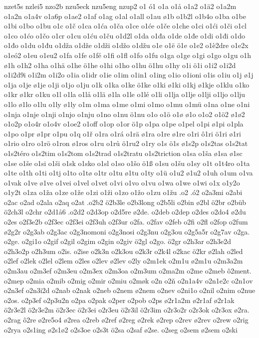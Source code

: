 {{nzet5s
nzlei5
nzo2b
nzu5eck
nzu5eng
nzup2
o1
ó1
o1a
o1å
o1a2
o1ä2
o1a2m
o1a2n
o1a4v
o1a6p
o1ae2
o1af
o1ag
o1al
o1all
o1au
ø1b
o1b2l
o1b4o
o1ba
o1be
o1bi
o1bo
o1bu
o1c
o1č
o1ca
o1ća
o1ča
o1ce
o1će
o1če
o1che
o1ci
o1ći
o1či
o1cl
o1co
o1ćo
o1čo
o1cr
o1cu
o1ću
o1ču
o1d2l
o1da
o1đa
o1de
o1đe
o1di
o1đi
o1do
o1đo
o1du
o1đu
o1dža
o1dže
o1dži
o1džo
o1džu
o1e
o1ë
ö1e
o1e2
o1è2dre
o1e2x
o1eó2
o1eu
o1eu2
o1fa
o1fe
o1fé
o1fi
o1fl
o1fo
o1fu
o1ga
o1ge
o1gi
o1go
o1gu
o1h
ø1h
o1h2
o1ha
o1hä
o1he
ö1he
o1hi
o1ho
o1hu
ö1hu
o1hy
o1i
ö1i
o1i2
o1i2d
o1i2d9i
o1i2m
o1i2o
o1ia
o1idr
o1ie
o1im
o1in1
o1ing
o1io
o1ioni
o1is
o1iu
o1j
ø1j
o1ja
o1je
ø1je
o1ji
o1jo
o1ju
o1k
o1ka
o1ke
ö1ke
o1ki
ø1ki
o1kj
ø1kje
o1klu
o1ko
o1kr
ø1kr
o1ku
o1l
o1la
o1lå
o1lä
ø1la
o1le
o1lé
o1li
o1lja
o1lje
o1lji
o1ljo
o1lju
o1lo
ø1lo
o1lu
o1ly
ø1ly
o1m
o1ma
o1me
o1mi
o1mo
o1mu
o1mü
o1na
o1ne
o1ni
o1nja
o1nje
o1nji
o1njo
o1nju
o1no
o1nu
ö1nu
o1o
o1ö
o1ø
ø1o
o1o2
o1ö2
ø1ø2
o1o2p
o1o4r
o1o4v
o1oe2
o1off
o1op
o1or
ö1p
o1pa
o1pe
o1pel
o1pi
ø1pi
o1pla
o1po
o1pr
ø1pr
o1pu
o1q
o1ř
o1ra
o1rá
o1rä
ø1ra
o1re
ø1re
o1ri
ô1ri
ö1ri
ø1ri
o1rio
o1ro
o1rö
o1ron
ø1ros
o1ru
o1rů
ö1ru2
o1ry
o1s
ö1s
ø1s2p
o1s2tas
o1s2tat
o1s2téro
o1s2tim
o1s2tom
o1s2trad
o1s2tratu
o1s2triction
o1sa
o1ša
ø1sa
ø1sc
o1se
o1še
o1si
o1ši
o1sk
o1sko
o1sl
o1so
o1šo
ö1ß
o1su
o1šu
o1sy
o1t
o1t4ro
o1ta
o1te
o1th
o1ti
o1tj
o1to
o1tø
o1tr
o1tu
ø1tu
o1ty
o1ü
o1u2
ø1u2
o1uh
o1um
o1va
o1vak
o1ve
ø1ve
o1vei
o1vel
o1vet
o1vi
o1vo
o1vu
o1wa
o1we
o1wi
o1x
o1y2o
o1y2t
o1za
o1ža
o1ze
o1že
o1zi
o1ži
o1zo
o1žo
o1zu
o1žu
.o2
.ó2
o2a3mi
o2abi
o2ac
o2ad
o2ala
o2aq
o2at
.o2b2
ö2b3le
o2b3long
o2b5li
o2bin
ø2bl
ö2br
o2büb
ö2ch3l
o2chr
o2d1å6
.o2d2
o2d3op
o2d5re
ø2de.
o2deb
o2dep
o2des
o2do4
ø2du
o2es
o2f3e2b
o2f3ec
o2f3ei
o2f3uh
o2f3ur
o2fa.
o2fav
o2feb
o2fi
o2fl
o2fop
o2fum
ø2g2r
o2g3ab
o2g3ac
o2g3nomoni
o2g3nosi
o2g3nu
o2g3ou
o2g5a5r
o2g7av
o2ga.
o2ge.
o2gi1o
o2gif
o2gil
o2gim
o2gin
o2giv
ö2gl
o2go.
ö2gr
o2h3ar
o2h3e2d
o2h3o2p
o2h3um
o2is.
o2ise
o2k3n
o2k3ou
o2k3r
o2k4l
o2kac
ö2kr
ø2lah
o2led
o2lef
o2lek
o2lel
o2lem
o2les
o2lev
ø2lev
o2ly
o2m1ek
o2m1u
ø2m1u
o2m3a2m
o2m3au
o2m3ef
o2m3eu
o2m3ex
o2m3oa
o2m3um
o2ma2m
o2me
o2meb
ô2ment.
o2mep
o2mia
o2mib
o2mig
o2mir
o2miu
o2møk
o2n
o2ň
o2n1a4v
o2n1e2c
o2n1ov
o2n3ef
o2n3i2d
o2nab
o2nak
o2neb
o2nem
ø2nem
o2nev
o2ni1o
o2nil
o2nim
o2nue
o2os.
o2p3ef
o2p3u2n
o2pa
o2pak
o2per
o2pob
o2ps
ø2r1a2m
ø2r1af
ø2r1ak
ö2r3e2l
ö2r3e2m
ö2r3ec
ö2r3ei
o2r3eu
ö2r3il
ö2r3im
o2r3o2r
o2r3ok
o2r3ox
ø2ra.
o2rag
ô2re
ø2re5o4
ø2rea
o2reb
ø2ref
ø2reg
ø2rek
ø2rep
o2rev
ø2rev
o2rew
o2rig
o2rya
o2s1ing
ø2s1ø2
o2s3oe
o2s3t
ö2sa
o2saf
ø2se.
o2seg
o2sem
ø2sem
o2ski
}}
